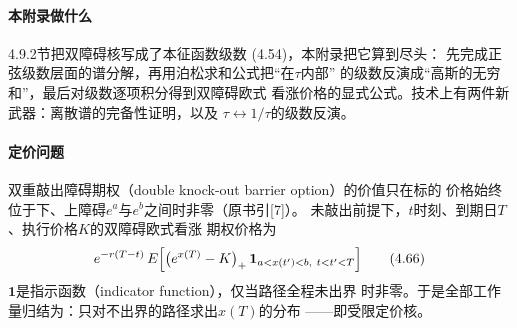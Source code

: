 \paragraph{本附录做什么}
4.9.2节把双障碍核写成了本征函数级数 (4.54)，本附录把它算到尽头：
先完成正弦级数层面的谱分解，再用泊松求和公式把“在$\tau$内部”
的级数反演成“高斯的无穷和”，最后对级数逐项积分得到双障碍欧式
看涨价格的显式公式。技术上有两件新武器：离散谱的完备性证明，以及
$\tau\leftrightarrow1/\tau$的级数反演。

\paragraph{定价问题}
双重敲出障碍期权（double knock-out barrier option）的价值只在标的
价格始终位于下、上障碍$e^{a}$与$e^{b}$之间时非零（原书引[7]）。
未敲出前提下，$t$时刻、到期日$T$、执行价格$K$的双障碍欧式看涨
期权价格为
\begin{equation*}
e^{-r(T-t)}\,E\Bigl[\bigl(e^{x(T)}-K\bigr)_{+}\,
\mathbf{1}_{a<x(t')<b,\ t<t'<T}\Bigr]
\tag{4.66}
\end{equation*}
$\mathbf{1}$是指示函数（indicator function），仅当路径全程未出界
时非零。于是全部工作量归结为：只对不出界的路径求出$x(T)$的分布
——即受限定价核。

